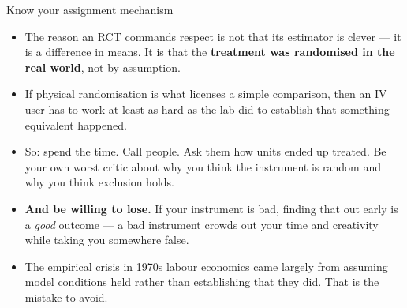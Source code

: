\documentclass[
  11pt,
  ignorenonframetext,
  aspectratio=169,
]{beamer}
\providecommand{\tightlist}{%
  \setlength{\itemsep}{0pt}\setlength{\parskip}{0pt}}
\begin{document}
\begin{frame}{Know your assignment mechanism}
\protect{}\label{know-your-assignment-mechanism}
\begin{itemize}
\tightlist
\item
  The reason an RCT commands respect is not that its estimator is clever
  --- it is a difference in means. It is that the \textbf{treatment was
  randomised in the real world}, not by assumption.
\item
  If physical randomisation is what licenses a simple comparison, then
  an IV user has to work at least as hard as the lab did to establish
  that something equivalent happened.
\item
  So: spend the time. Call people. Ask them how units ended up treated.
  Be your own worst critic about why you think the instrument is random
  and why you think exclusion holds.
\item
  \textbf{And be willing to lose.} If your instrument is bad, finding
  that out early is a \emph{good} outcome --- a bad instrument crowds
  out your time and creativity while taking you somewhere false.
\item
  The empirical crisis in 1970s labour economics came largely from
  assuming model conditions held rather than establishing that they did.
  That is the mistake to avoid.
\end{itemize}
\end{frame}
\end{document}
